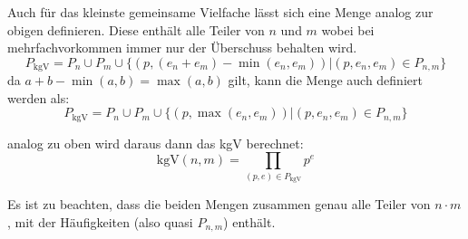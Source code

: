 \documentclass[DIN, pagenumber=false, fontsize=11pt, parskip=half]{scrartcl}
\begin{document}
\begin{enumerate}[label=(\roman*)]
            Auch für das kleinste gemeinsame Vielfache lässt sich eine Menge analog
            zur obigen definieren. Diese enthält alle Teiler von $n$ und $m$ wobei
            bei mehrfachvorkommen immer nur der Überschuss behalten wird.
            \begin{equation}
                P_\text{kgV} = P_n \cup P_m \cup
                    \{(p, (e_n + e_m) - \min(e_n, e_m)) | (p, e_n, e_m) \in P_{n,m}\}
            \end{equation}
            da $a+b - \min(a,b) = \max(a,b)$ gilt, kann die Menge auch definiert werden
            als:
            \begin{equation}
                P_\text{kgV} = P_n \cup P_m \cup
                    \{(p, \max(e_n, e_m)) | (p, e_n, e_m) \in P_{n,m}\}
            \end{equation}

            analog zu oben wird daraus dann das kgV berechnet:
            \begin{equation}
                \text{kgV}(n, m) = \prod_{(p, e) \in P_\text{kgV}} p^e 
            \end{equation}

            Es ist zu beachten, dass die beiden Mengen zusammen genau alle Teiler von 
            $n\cdot m$, mit der Häufigkeiten (also quasi $P_{n,m}$) enthält.


\end{enumerate}
\end{document}
